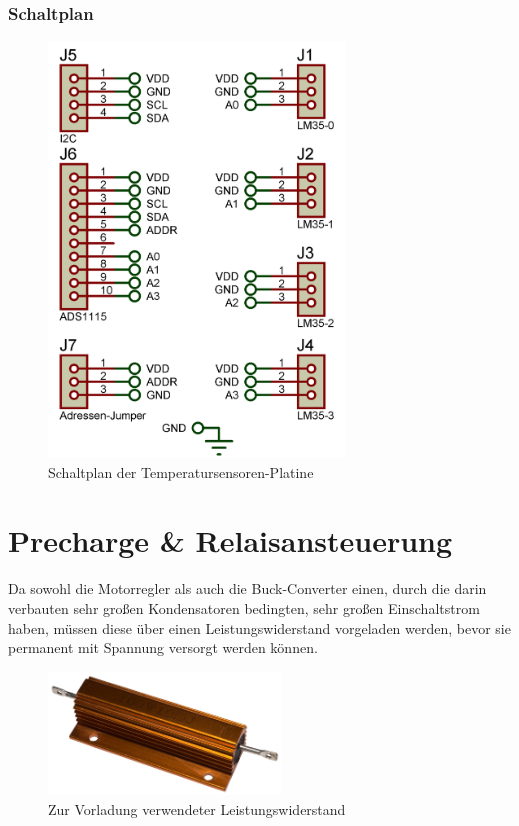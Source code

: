 \subsubsection{Schaltplan}
\begin{figure}[h]
    \centering
    \includegraphics[width=0.7\textwidth]{../Proteus/Exports/Temperatursensoren-Platine.png}    
    \caption{Schaltplan der Temperatursensoren-Platine}
\end{figure}

\newpage
\section{Precharge \& Relaisansteuerung}
Da sowohl die Motorregler als auch die Buck-Converter einen, durch die darin verbauten sehr großen Kondensatoren bedingten, sehr großen Einschaltstrom haben, 
müssen diese über einen Leistungswiderstand vorgeladen werden, bevor sie permanent mit Spannung versorgt werden können.\\
\begin{figure}[h]
    \centering
    \includegraphics[width=0.55\textwidth]{Fotos/Leistungswiderstand.png}
    \caption{Zur Vorladung verwendeter Leistungswiderstand}
\end{figure}

